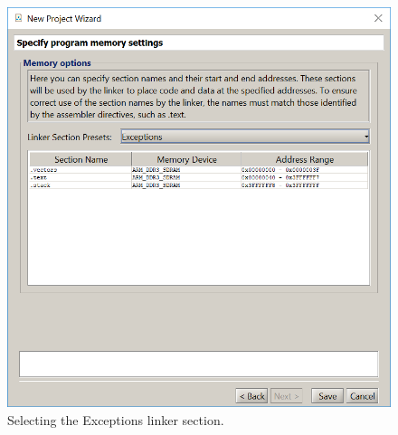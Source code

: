 \documentclass[epsfig,10pt,fullpage]{article}
\begin{document}
~\\
\begin{figure}[H]
	\begin{center}
	\includegraphics[scale=0.8]{figures/exceptions_s.png}
	\end{center}
	\vspace{-0.25cm}\caption{Selecting the {\sf Exceptions} linker section.}
\label{fig:exceptions}
\end{figure}
\newpage
\end{document}
